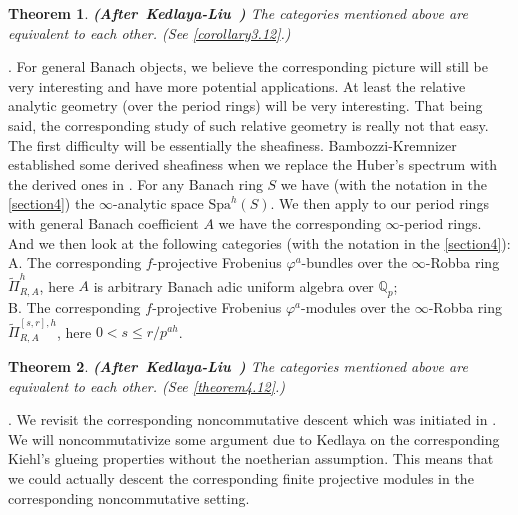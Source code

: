 \documentclass[12pt]{amsart}
\newtheorem{theorem}{Theorem}[section]
\theoremstyle{definition}
\numberwithin{equation}{section}
\begin{document}
\begin{theorem}\mbox{\bf{(After Kedlaya-Liu \cite[Theorem 4.6.1]{KL2})}}
The categories mentioned above are equivalent to each other. (See \cref{corollary3.12}.)\\
	
\end{theorem}



. For general Banach objects, we believe the corresponding picture will still be very interesting and have more potential applications. At least the relative analytic geometry (over the period rings) will be very interesting. That being said, the corresponding study of such relative geometry is really not that easy. The first difficulty will be essentially the sheafiness. Bambozzi-Kremnizer established some derived sheafiness when we replace the Huber's spectrum with the derived ones in \cite{BK}. For any Banach ring $S$ we have (with the notation in the \cref{section4}) the $\infty$-analytic space $\mathrm{Spa}^h(S)$. We then apply to our period rings with general Banach coefficient $A$ we have the corresponding $\infty$-period rings. And we then look at the following categories (with the notation in the \cref{section4}):\\


\noindent A. The corresponding $f$-projective Frobenius $\varphi^a$-bundles over the $\infty$-Robba ring $\widetilde{\Pi}^{h}_{R,A}$, here $A$ is arbitrary Banach adic uniform algebra over $\mathbb{Q}_p$;\\
\noindent B. The corresponding $f$-projective Frobenius $\varphi^a$-modules over the $\infty$-Robba ring $\widetilde{\Pi}^{[s,r],h}_{R,A}$, here $0<s\leq r/p^{ah}$.


\begin{theorem}\mbox{\bf{(After Kedlaya-Liu \cite[Theorem 4.6.1]{KL2})}}
The categories mentioned above are equivalent to each other. (See \cref{theorem4.12}.)\\
	
\end{theorem}


. We revisit the corresponding noncommutative descent which was initiated in \cite{T2}. We will noncommutativize some argument due to Kedlaya on the corresponding Kiehl's glueing properties without the noetherian assumption. This means that we could actually descent the corresponding finite projective modules in the corresponding noncommutative setting. 
\end{document}
